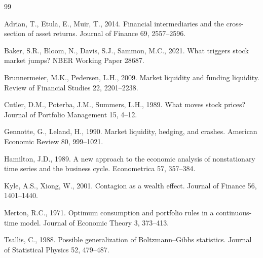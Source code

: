 \documentclass[11pt,a4paper]{article}
\begin{document}
\begin{thebibliography}{99}
\small

Adrian, T., Etula, E., Muir, T., 2014. Financial intermediaries and the cross-section of
asset returns. Journal of Finance 69, 2557--2596.

Baker, S.R., Bloom, N., Davis, S.J., Sammon, M.C., 2021. What triggers stock market jumps?
NBER Working Paper 28687.

Brunnermeier, M.K., Pedersen, L.H., 2009. Market liquidity and funding liquidity. Review of
Financial Studies 22, 2201--2238.

Cutler, D.M., Poterba, J.M., Summers, L.H., 1989. What moves stock prices? Journal of
Portfolio Management 15, 4--12.

Gennotte, G., Leland, H., 1990. Market liquidity, hedging, and crashes. American Economic
Review 80, 999--1021.

Hamilton, J.D., 1989. A new approach to the economic analysis of nonstationary time series
and the business cycle. Econometrica 57, 357--384.

Kyle, A.S., Xiong, W., 2001. Contagion as a wealth effect. Journal of Finance 56,
1401--1440.

Merton, R.C., 1971. Optimum consumption and portfolio rules in a continuous-time model.
Journal of Economic Theory 3, 373--413.

Tsallis, C., 1988. Possible generalization of Boltzmann--Gibbs statistics. Journal of
Statistical Physics 52, 479--487.

\end{thebibliography}
\end{document}
